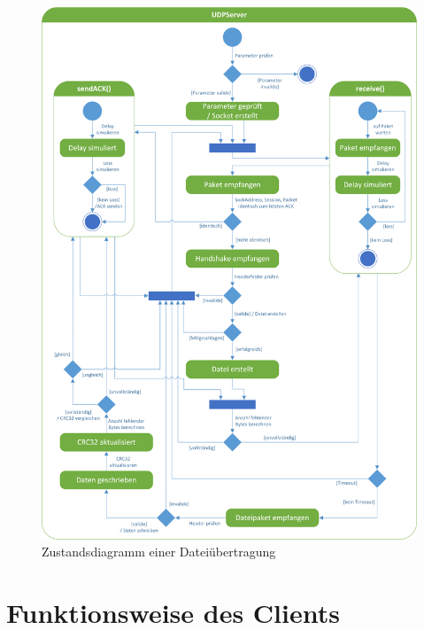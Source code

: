 \begin{figure}
	\centering
	\includegraphics[width=\textwidth,height=\textheight,keepaspectratio]{assets/UDPServer.png}
	\caption{Zustandsdiagramm einer Dateiübertragung}
\end{figure}

\chapter{Funktionsweise des Clients}


